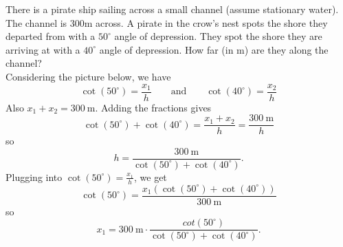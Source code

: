 There is a pirate ship sailing across a small channel (assume stationary water). The channel is $300$m across. A pirate in the crow's nest spots the shore they departed from with a $50^{\circ}$ angle of depression. They spot the shore they are arriving at with a $40^{\circ}$ angle of depression. How far (in m) are they along the channel?
\[\]
Considering the picture below, we have
$$
\cot(50^{\circ}) = \frac{x_1}{h} \qquad \text{and} \qquad \cot(40^{\circ}) = \frac{x_2}{h}
$$
Also $x_1 + x_2 = 300\ \text{m}$. Adding the fractions gives
$$
\cot(50^{\circ}) + \cot(40^{\circ}) = \frac{x_1 + x_2}{h} = \frac{300\ \text{m}}{h}
$$
so
$$
h = \frac{300\ \text{m}}{\cot(50^{\circ}) + \cot(40^{\circ})}.
$$
Plugging into $\cot(50^{\circ}) = \frac{x_1}{h}$, we get
$$
  \cot(50^{\circ}) = \frac{x_1(\cot(50^{\circ}) + \cot(40^{\circ}))}{300\ \text{m}}
$$
so
$$
  x_1 = 300\ \text{m} \cdot \frac{cot(50^{\circ})}{\cot(50^{\circ}) + \cot(40^{\circ})}.
$$
